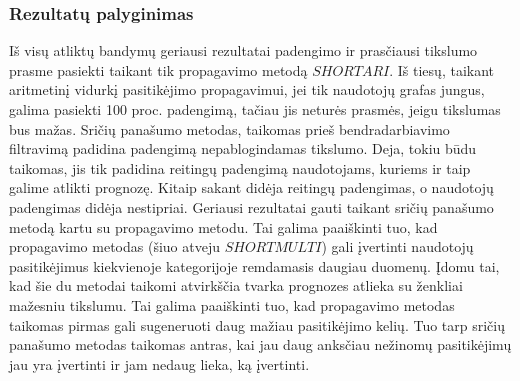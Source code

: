 \documentclass{VUMIFInfMagistrinis}
\begin{document}
\subsubsection{Rezultatų palyginimas}
\indent
Iš visų atliktų bandymų geriausi rezultatai padengimo ir prasčiausi tikslumo prasme pasiekti taikant tik propagavimo metodą $SHORTARI$. Iš tiesų, taikant aritmetinį vidurkį pasitikėjimo propagavimui, jei tik naudotojų grafas jungus, galima pasiekti 100 proc. padengimą, tačiau jis neturės prasmės, jeigu tikslumas bus mažas.
\newline
\indent
Sričių panašumo metodas, taikomas prieš bendradarbiavimo filtravimą padidina padengimą nepablogindamas tikslumo. Deja, tokiu būdu taikomas, jis tik padidina reitingų padengimą naudotojams, kuriems ir taip galime atlikti prognozę. Kitaip sakant didėja reitingų padengimas, o naudotojų padengimas didėja nestipriai.
\newline
\indent
Geriausi rezultatai gauti taikant sričių panašumo metodą kartu su propagavimo metodu. Tai galima paaiškinti tuo, kad propagavimo metodas (šiuo atveju $SHORTMULTI$) gali įvertinti naudotojų pasitikėjimus kiekvienoje kategorijoje remdamasis daugiau duomenų. 
\newline 
\indent
Įdomu tai, kad šie du metodai taikomi atvirkščia tvarka prognozes atlieka su ženkliai mažesniu tikslumu. Tai galima paaiškinti tuo, kad propagavimo metodas taikomas pirmas gali sugeneruoti daug mažiau pasitikėjimo kelių. Tuo tarp sričių panašumo metodas taikomas antras, kai jau daug anksčiau nežinomų pasitikėjimų jau yra įvertinti ir jam nedaug lieka, ką įvertinti.
\end{document}
